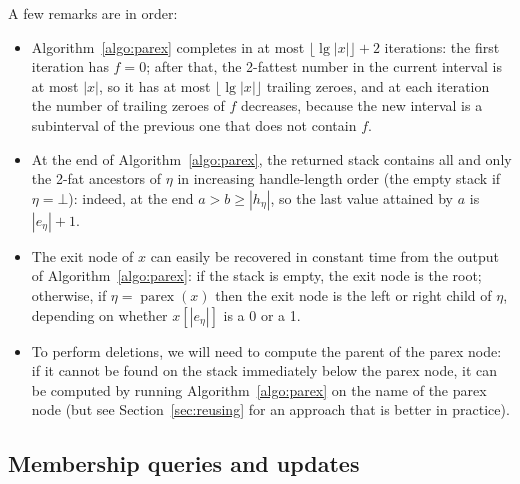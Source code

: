 \documentclass[a4paper]{article}
\newcommand{\exit}[1]{\operatorname{exit}(#1)}
\newcommand{\parex}[1]{\operatorname{parex}(#1)}
\newcommand{\?}{\mskip1.5mu}
\def\..{\,\mathpunct{\ldotp\ldotp}} %
\begin{document}
\begin{table}
\centering

\vspace*{.5cm}
\caption{\label{tab:example-query-parex}Execution of Algorithm~\ref{algo:parex} on the trie of Figure~\ref{fig:large-example}
with $x=01110101111100001100$: the longest prefix of $x$ that is in the trie is in boldface (and
the corresponding nodes are used to label the frames). Here $\exit x=\alpha_5$ whereas $\parex x=\alpha_1$. 
The grey rectangle depicts the current search interval $[a\..b]$,
the vertical line indicates the position $f$, whereas the dashed lines refer to node handles.}
\end{table}

A few remarks are in order:
\begin{itemize}
  \item Algorithm~\ref{algo:parex} completes in at most $\lfloor\lg|x|\rfloor+2$ iterations: 
  the first iteration has $f=0$; after that, the 2-fattest number in the current interval
  is at most $|x|$, so it has at most $\lfloor\lg|x|\rfloor$ trailing zeroes, and at each iteration 
  the number of trailing zeroes of $f$ decreases, because the new interval is a subinterval of the previous one that 
  does not contain $f$.
  \item At the end of Algorithm~\ref{algo:parex}, the returned stack contains
  all and only the 2-fat ancestors of $\eta$ in increasing handle-length order (the empty
  stack if $\eta=\bot$): indeed, at the end $a>b\geq|h_\eta|$, so the last value attained by $a$ is $|e_\eta|+1$.
  \item The exit node of $x$ can easily be recovered in constant
time from the output of Algorithm~\ref{algo:parex}: if the stack is empty, the exit node is the root; otherwise,
if $\eta=\parex x$ then the exit node is the left or right child of $\eta$, depending on 
whether $x[|e_\eta|]$ is a 0 or a 1.
  \item To perform deletions, we will need to compute the parent of the parex node: if it
  cannot be found on the stack immediately below the parex node, it can be computed by running
   Algorithm~\ref{algo:parex} on the name of the parex node (but see Section~\ref{sec:reusing} for an approach that is better in practice).
\end{itemize}

\subsection{Membership queries and updates}
\label{sec:updates}
\end{document}
